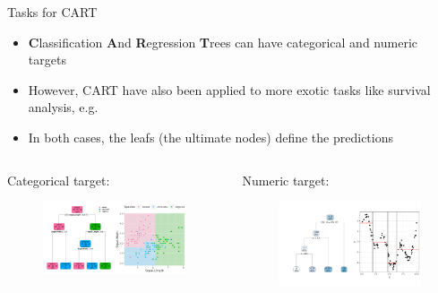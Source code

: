 \documentclass[11pt,compress,t,notes=noshow, xcolor=table]{beamer}
\begin{document}
\begin{vbframe}{Tasks for CART}
  \begin{itemize}
    \item \textbf{C}lassification \textbf{A}nd \textbf{R}egression \textbf{T}rees can have categorical and numeric targets
    \item However, CART have also been applied to more exotic tasks like survival analysis, e.g. 
    \item In both cases, the leafs (the ultimate nodes) define the predictions
  \end{itemize}
  
  \begin{columns}
\begin{column}{0.5\textwidth}
  Categorical target:
    \begin{figure}
    \centering
\includegraphics[width=0.99\textwidth, keepaspectratio]{figure/tree-classif-depth3.pdf}
    \end{figure}
\end{column}
\begin{column}{0.5\textwidth}
  Numeric target:
    \begin{figure}
    \centering
\includegraphics[width=0.99\textwidth, keepaspectratio]{figure/tree-regr-depth3.pdf}
    \end{figure}
\end{column}
\end{columns}
  
\end{vbframe}
\end{document}

